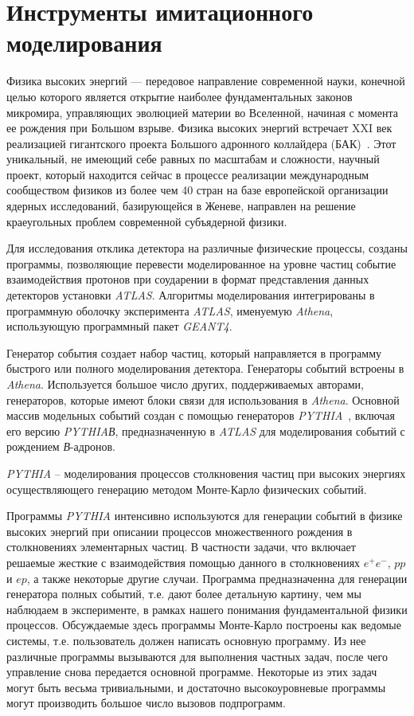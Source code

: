 \section{Инструменты имитационного моделирования}

Физика высоких энергий — передовое направление современной науки, конечной целью которого является открытие наиболее фундаментальных законов микромира, управляющих эволюцией материи во Вселенной, начиная с момента ее рождения при Большом взрыве. Физика высоких энергий встречает XXI век реализацией гигантского проекта Большого адронного коллайдера (БАК)~\cite{2part-1}. Этот уникальный, не имеющий себе равных по масштабам и сложности, научный проект, который находится сейчас в процессе реализации международным сообществом физиков из более чем 40 стран на базе европейской организации ядерных исследований, базирующейся в Женеве, направлен на решение краеугольных проблем современной субъядерной физики.

Для исследования отклика детектора на различные физические процессы, созданы программы, позволяющие перевести моделированное на уровне частиц событие  взаимодействия протонов при соударении в формат представления данных детекторов установки \textit{ATLAS}. Алгоритмы моделирования интегрированы в программную оболочку эксперимента  \textit{ATLAS}, именуемую \textit{Athena}, использующую программный пакет \textit{GEANT4}.

Генератор события создает набор частиц, который направляется в программу быстрого или полного моделирования детектора. Генераторы событий встроены в \textit{Athena}. Используется большое число других, поддерживаемых авторами, генераторов, которые имеют блоки связи для использования в \textit{Athena}. Основной массив модельных событий создан с помощью генераторов \textit{PYTHIA}~\cite{2part-pythia-all}, включая его версию \textit{PYTHIAВ},  предназначенную в  \textit{ATLAS} для моделирования событий с рождением \textit{В}-адронов.

\textit{PYTHIA} -- моделирования процессов столкновения частиц при высоких энергиях осуществляющего генерацию методом Монте-Карло физических событий.

Программы \textit{PYTHIA} интенсивно используются для генерации событий в физике высоких энергий при описании процессов множественного рождения в столкновениях элементарных частиц. В частности задачи, что включает решаемые жесткие с взаимодействия помощью данного в столкновениях $e^+e^-$, $pp$ и $ep$, а также некоторые другие случаи. Программа предназначенна для генерации генератора полных событий, т.е. дают более детальную картину, чем мы наблюдаем в эксперименте, в рамках нашего понимания фундаментальной физики процессов. Обсуждаемые здесь программы Монте-Карло построены как ведомые системы, т.е. пользователь должен написать основную программу. Из нее различные программы вызываются для выполнения частных задач, после чего управление снова передается основной программе. Некоторые из этих задач могут быть весьма тривиальными, и достаточно высокоуровневые программы могут производить большое число вызовов подпрограмм.

